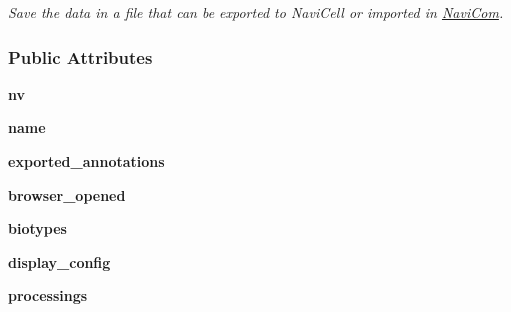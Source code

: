 \begin{DoxyCompactItemize}
\begin{DoxyCompactList}\small\item\em Save the data in a file that can be exported to NaviCell or imported in \hyperlink{classnavicom_1_1navicom_1_1NaviCom}{NaviCom}. \item\end{DoxyCompactList}\end{DoxyCompactItemize}
\subsubsection*{Public Attributes}
\begin{DoxyCompactItemize}
\item 
\hypertarget{classnavicom_1_1navicom_1_1NaviCom_af740fe52f9f3cfc076ae88ca696bd05e}{
{\bfseries nv}}
\label{classnavicom_1_1navicom_1_1NaviCom_af740fe52f9f3cfc076ae88ca696bd05e}

\item 
\hypertarget{classnavicom_1_1navicom_1_1NaviCom_a950e5ebf199edea40d55c506b8aaf134}{
{\bfseries name}}
\label{classnavicom_1_1navicom_1_1NaviCom_a950e5ebf199edea40d55c506b8aaf134}

\item 
\hypertarget{classnavicom_1_1navicom_1_1NaviCom_aff54ed91d1f335cea31829f59d4efb81}{
{\bfseries exported\_\-annotations}}
\label{classnavicom_1_1navicom_1_1NaviCom_aff54ed91d1f335cea31829f59d4efb81}

\item 
\hypertarget{classnavicom_1_1navicom_1_1NaviCom_a32c1346193b73ea8558dd0318ae6932c}{
{\bfseries browser\_\-opened}}
\label{classnavicom_1_1navicom_1_1NaviCom_a32c1346193b73ea8558dd0318ae6932c}

\item 
\hypertarget{classnavicom_1_1navicom_1_1NaviCom_a48c57d5aca173ba7167dbc51501fb1ac}{
{\bfseries biotypes}}
\label{classnavicom_1_1navicom_1_1NaviCom_a48c57d5aca173ba7167dbc51501fb1ac}

\item 
\hypertarget{classnavicom_1_1navicom_1_1NaviCom_a56628d774db59cb8b06af3801fb6306c}{
{\bfseries display\_\-config}}
\label{classnavicom_1_1navicom_1_1NaviCom_a56628d774db59cb8b06af3801fb6306c}

\item 
\hypertarget{classnavicom_1_1navicom_1_1NaviCom_a5a255d56e997ddcc653d8f06c741ea13}{
{\bfseries processings}}
\label{classnavicom_1_1navicom_1_1NaviCom_a5a255d56e997ddcc653d8f06c741ea13}


\end{DoxyCompactItemize}
